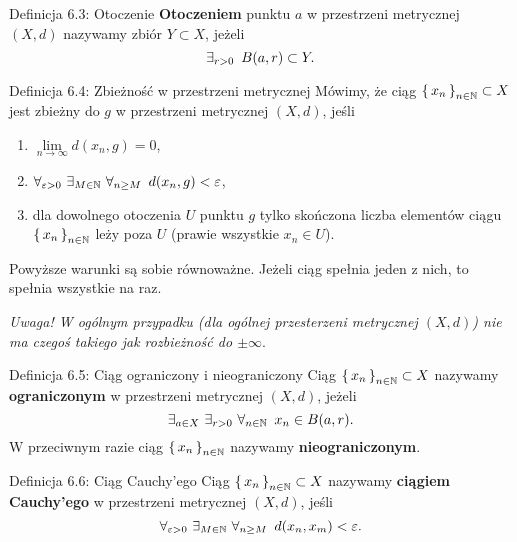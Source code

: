 \documentclass{article}
\newcommand{\hquad}{\mkern9mu}
\newcommand{\N}{\mathbb{N}}
\newcommand{\lin}[1]{\lim\limits_{n\to\infty}{#1}}
\newcommand{\seq}[1]{\set{#1_n}_{n\in\N}}
\begin{document}
\begin{defr}{Definicja 6.3: Otoczenie}
    \textbf{Otoczeniem} punktu $a$ w przestrzeni metrycznej $(X,d)$ nazywamy zbiór $Y\subset X$, jeżeli
    \begin{equation*}
        \exists_{r>0}\hquad B(a,r)\subset Y.
    \end{equation*}
\end{defr}

\begin{defr}{Definicja 6.4: Zbieżność w przestrzeni metrycznej}
    Mówimy, że ciąg $\seq{x}\subset X$ jest zbieżny do $g$ w przestrzeni metrycznej $(X,d)$, jeśli
    \begin{enumerate}[label=(\arabic*)]
        \item $\lin{d(x_n,g)}=0$,
        \item $\forall_{\varepsilon>0}\ \exists_{M\in\N}\ \forall_{n\ge M}\hquad d(x_n,g)<\varepsilon$,
        \item dla dowolnego otoczenia $U$ punktu $g$ tylko skończona liczba elementów ciągu $\seq{x}$
        leży poza $U$ (prawie wszystkie $x_n\in U$).
    \end{enumerate}
\end{defr}

Powyższe warunki są sobie równoważne. Jeżeli ciąg spełnia jeden z nich, to spełnia wszystkie na raz.\smallskip

\textit{Uwaga! W ogólnym przypadku (dla ogólnej przesterzeni metrycznej $(X,d)$) nie ma czegoś
takiego jak rozbieżność do $\pm\infty$}.

\begin{defr}{Definicja 6.5: Ciąg ograniczony i nieograniczony}
    Ciąg $\seq{x}\subset X$ nazywamy \textbf{ograniczonym} w przestrzeni metrycznej $(X,d)$, jeżeli
    \begin{equation*}
        \exists_{a\in X}\ \exists_{r>0}\ \forall_{n\in\N}\hquad x_n\in B(a,r).
    \end{equation*}
    W przeciwnym razie ciąg $\seq{x}$ nazywamy \textbf{nieograniczonym}.
\end{defr}

\begin{defr}{Definicja 6.6: Ciąg Cauchy'ego}
    Ciąg $\seq{x}\subset X$ nazywamy \textbf{ciągiem Cauchy'ego} w przestrzeni metrycznej $(X,d)$, jeśli
    \begin{equation*}
        \forall_{\varepsilon>0}\ \exists_{M\in\N}\ \forall_{n\ge M}\hquad d(x_n,x_m)<\varepsilon.
    \end{equation*}
\end{defr}
\end{document}
